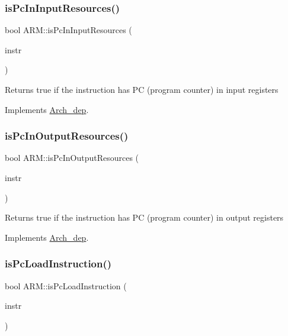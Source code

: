 \subsubsection{\texorpdfstring{is\+Pc\+In\+Input\+Resources()}{isPcInInputResources()}}
{\footnotesize\ttfamily bool A\+R\+M\+::is\+Pc\+In\+Input\+Resources (\begin{DoxyParamCaption}\item[{const \hyperlink{classObjdumpInstruction}{Objdump\+Instruction} \&}]{instr }\end{DoxyParamCaption})\hspace{0.3cm}{\ttfamily [virtual]}}

Returns true if the instruction has PC (program counter) in input registers 

Implements \hyperlink{classArch__dep_ac6456dfba496bcf104d460c8610a484f}{Arch\+\_\+dep}.

\mbox{\label{classARM_a664d4db9519b9a24f107cf3f23974453}} 
\subsubsection{\texorpdfstring{is\+Pc\+In\+Output\+Resources()}{isPcInOutputResources()}}
{\footnotesize\ttfamily bool A\+R\+M\+::is\+Pc\+In\+Output\+Resources (\begin{DoxyParamCaption}\item[{const \hyperlink{classObjdumpInstruction}{Objdump\+Instruction} \&}]{instr }\end{DoxyParamCaption})\hspace{0.3cm}{\ttfamily [virtual]}}

Returns true if the instruction has PC (program counter) in output registers 

Implements \hyperlink{classArch__dep_a89b89f3e5248442dda296986f5673bb6}{Arch\+\_\+dep}.

\mbox{\label{classARM_a765b29f0b8e3226723000d2f8d68ec8e}} 
\subsubsection{\texorpdfstring{is\+Pc\+Load\+Instruction()}{isPcLoadInstruction()}}
{\footnotesize\ttfamily bool A\+R\+M\+::is\+Pc\+Load\+Instruction (\begin{DoxyParamCaption}\item[{string \&}]{instr }\end{DoxyParamCaption})\hspace{0.3cm}{\ttfamily [virtual]}}



